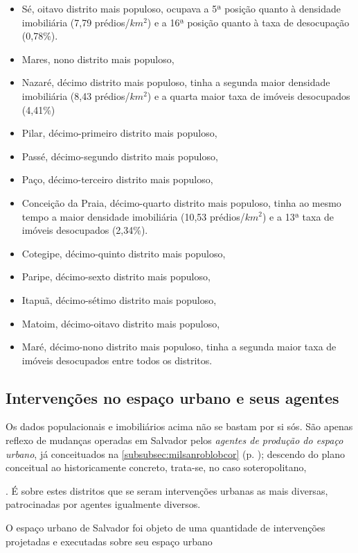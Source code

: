\begin{itemize}
 \item Sé, oitavo distrito mais populoso, ocupava a 5ª posição quanto à densidade imobiliária (7,79 prédios/$km^{2}$) e a 16ª posição quanto à taxa de desocupação (0,78\%). 
 \item Mares, nono distrito mais populoso,
 \item Nazaré, décimo distrito mais populoso, tinha a segunda maior densidade imobiliária (8,43 prédios/$km^{2}$) e a quarta maior taxa de imóveis desocupados (4,41\%)
 \item Pilar, décimo-primeiro distrito mais populoso,
 \item Passé, décimo-segundo distrito mais populoso,
 \item Paço, décimo-terceiro distrito mais populoso,
 \item Conceição da Praia, décimo-quarto distrito mais populoso, tinha ao mesmo tempo a maior densidade imobiliária (10,53 prédios/$km^{2}$) e a 13ª taxa de imóveis desocupados (2,34\%).
 \item Cotegipe, décimo-quinto distrito mais populoso,
 \item Paripe, décimo-sexto distrito mais populoso,
 \item Itapuã, décimo-sétimo distrito mais populoso,
 \item Matoim, décimo-oitavo distrito mais populoso,
 \item Maré, décimo-nono distrito mais populoso, tinha a segunda maior taxa de imóveis desocupados entre todos os distritos.
\end{itemize}

\subsection{Intervenções no espaço urbano e seus agentes}\label{subsec:1.4.3}

Os dados populacionais e imobiliários acima não se bastam por si sós. São apenas reflexo de mudanças operadas em Salvador pelos \textit{agentes de produção do espaço urbano}, já conceituados na \autoref{subsubsec:milsanroblobcor} (p. \pageref{subsubsec:milsanroblobcor}); descendo do plano conceitual ao historicamente concreto, trata-se, no caso soteropolitano, 

. É sobre estes distritos que se seram intervenções urbanas as mais diversas, patrocinadas por agentes igualmente diversos. 

O espaço urbano de Salvador foi objeto de uma quantidade de intervenções projetadas e executadas sobre seu espaço urbano 

